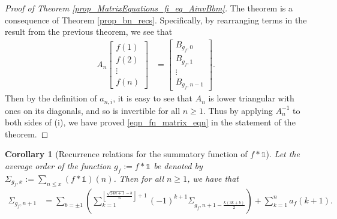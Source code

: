 \documentclass[12pt,reqno,a4letter]{article}
\numberwithin{figure}{section}
\numberwithin{table}{section}
\numberwithin{equation}{section}
\theoremstyle{plain}
\newtheorem{cor}[theorem]{Corollary}
\numberwithin{theorem}{section}
\theoremstyle{definition}
\begin{document}
\begin{proof}[Proof of Theorem \ref{prop_MatrixEquations_fi_eq_AinvBbm}] 
The theorem is a consequence of Theorem \ref{prop_bn_recs}. 
Specifically, by rearranging terms in the result from the previous theorem, 
we see that 
\begin{align*} 
\tag{i} 
A_n \begin{bmatrix} f(1) \\ f(2) \\ \vdots \\ f(n) \end{bmatrix} & = 
     \begin{bmatrix} B_{g_f,0} \\ B_{g_f,1} \\ \vdots \\ B_{g_f,n-1} \end{bmatrix}. 
\end{align*} 
Then by the definition of $a_{n,i}$, 
it is easy to see that 
$A_n$ is lower triangular with ones on its diagonals, and so is 
invertible for all $n \geq 1$. 
Thus by applying $A_n^{-1}$ to both sides of (i), we have proved 
\eqref{eqn_fn_matrix_eqn} in the statement of the theorem. 
\end{proof} 
\begin{cor}[Recurrence relations for the summatory function of $f \ast \mathds{1}$] 
\label{cor_Sigmabx_recs} 
Let the average order of the function $g_f := f \ast \mathds{1}$ be denoted by 
$\Sigma_{g_f,x} := \sum_{n \leq x} (f \ast \mathds{1})(n)$. 
Then for all $n \geq 1$, we have that 
\begin{align} 
\label{eqn_Sigmabx_recs}
\Sigma_{g_f,n+1} & = \sum_{b = \pm 1} \left( 
     \sum_{k=1}^{\left\lfloor \frac{\sqrt{24n+1}-b}{6} \right\rfloor + 1} 
     (-1)^{k+1} \Sigma_{g_f,n+1-\frac{k(3k+b)}{2}}\right) + 
     \sum_{k=1}^{n} a_f(k+1). 
\end{align} 
\end{cor}
\end{document}
